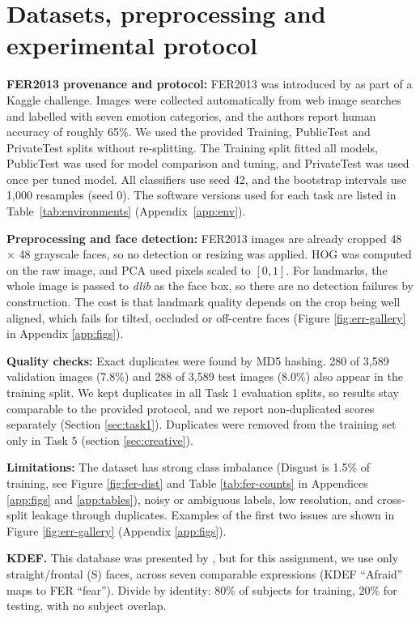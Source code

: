 \section{Datasets, preprocessing and experimental protocol}
\label{sec:data}
\textbf{FER2013 provenance and protocol:} FER2013 was introduced by \textcite{goodfellow_challenges} as part of a Kaggle challenge. Images were collected automatically from web image searches and labelled with seven emotion categories, and the authors report human accuracy of roughly 65\%. We used the provided Training, PublicTest and PrivateTest splits without re-splitting. The Training split fitted all models, PublicTest was used for model comparison and tuning, and PrivateTest was used once per tuned model. All classifiers use seed 42, and the bootstrap intervals use 1,000 resamples (seed 0). The software versions used for each task are listed in Table~\ref{tab:environments} (Appendix~\ref{app:env}).

\textbf{Preprocessing and face detection:} FER2013 images are already cropped 48 $\times$ 48 grayscale faces, so no detection or resizing was applied. HOG was computed on the raw image, and PCA used pixels scaled to $[0, 1]$. For landmarks, the whole image is passed to \textit{dlib} as the face box, so there are no detection failures by construction. The cost is that landmark quality depends on the crop being well aligned, which fails for tilted, occluded or off-centre faces (Figure \ref{fig:err-gallery} in Appendix \ref{app:figs}).

\textbf{Quality checks:} Exact duplicates were found by MD5 hashing. 280 of 3,589 validation images (7.8\%) and 288 of 3,589 test images (8.0\%) also appear in the training split. We kept duplicates in all Task 1 evaluation splits, so results stay comparable to the provided protocol, and we report non-duplicated scores separately (Section \ref{sec:task1}). Duplicates were removed from the training set only in Task 5 (section \ref{sec:creative}).

\textbf{Limitations:} The dataset has strong class imbalance (Disgust is 1.5\% of training, see Figure \ref{fig:fer-dist} and Table \ref{tab:fer-counts} in Appendices \ref{app:figs} and \ref{app:tables}), noisy or ambiguous labels, low resolution, and cross-split leakage through duplicates. Examples of the first two issues are shown in Figure \ref{fig:err-gallery} (Appendix \ref{app:figs}).

\textbf{KDEF.} This database was presented by \textcite{goeleven_karolinska}, but for this assignment, we use only straight/frontal (S) faces, across seven comparable expressions (KDEF ``Afraid'' maps to FER ``fear''). Divide by identity: 80\% of subjects for training, 20\% for testing, with no subject overlap.

